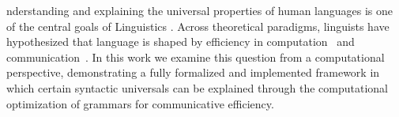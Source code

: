 \documentclass[9pt,twocolumn,twoside,lineno]{pnas-new}
\begin{document}


nderstanding and explaining the universal properties of human languages is one of the central goals of Linguistics \cite{behaghel1909beziehungen,zipf1949human,greenberg1963universals,chomsky1993lectures,...}.
Across theoretical paradigms, linguists have hypothesized that language is shaped by efficiency in computation~\cite{berwick1984grammatical,chomsky2005three, hawkins2007processing} and communication~\cite{zipf1949human, Croft:Cruse:2004, Goldberg:2005}.
In this work we examine this question from a computational perspective, demonstrating a fully formalized and implemented framework in which certain syntactic universals can be explained through the computational optimization of grammars for communicative efficiency. %








\end{document}
